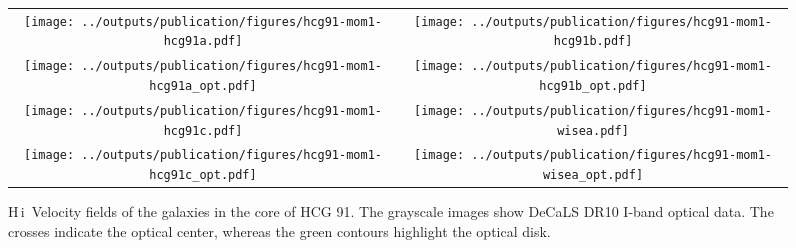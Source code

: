\documentclass{aa}
\newcommand{\HI}{H\,{\sc i}}
\begin{document}
\begin{figure*}
\begin{tabular}{c c}
    \texttt{[image: ../outputs/publication/figures/hcg91-mom1-hcg91a.pdf]} &
    \texttt{[image: ../outputs/publication/figures/hcg91-mom1-hcg91b.pdf]} \\[-0.2cm]
    \texttt{[image: ../outputs/publication/figures/hcg91-mom1-hcg91a\_opt.pdf]} &
    \texttt{[image: ../outputs/publication/figures/hcg91-mom1-hcg91b\_opt.pdf]} \\[-0.2cm]
    \texttt{[image: ../outputs/publication/figures/hcg91-mom1-hcg91c.pdf]} & 
    \texttt{[image: ../outputs/publication/figures/hcg91-mom1-wisea.pdf]} \\[-0.2cm]
    \texttt{[image: ../outputs/publication/figures/hcg91-mom1-hcg91c\_opt.pdf]} & 
    \texttt{[image: ../outputs/publication/figures/hcg91-mom1-wisea\_opt.pdf]}
  \end{tabular}
  \caption{\HI\ Velocity fields of the galaxies in the core of HCG 91. The grayscale images show DeCaLS DR10 I-band optical data. The crosses indicate the optical center, whereas the green contours highlight the optical disk.}
  \label{fig:hcg91_mom_cores}
 \end{figure*}

\end{document}

